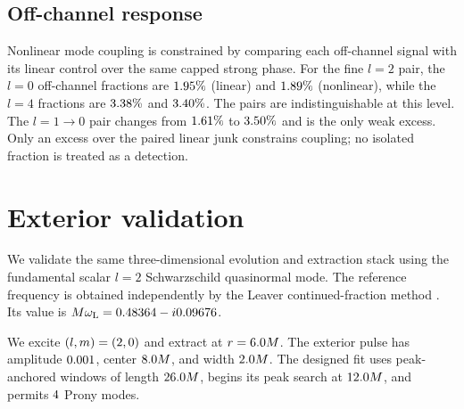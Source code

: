 \documentclass[
  aps,
  prd,
  reprint,
  superscriptaddress,
  nofootinbib,
  longbibliography
]{revtex4-2}
\begin{document}
\subsection{Off-channel response}

Nonlinear mode coupling is constrained by comparing each off-channel signal
with its linear control over the same capped strong phase.
For the fine $l=2$ pair, the $l=0$ off-channel fractions are
$1.95\%$ (linear) and $1.89\%$ (nonlinear),
while the $l=4$ fractions are $3.38\%$ and
$3.40\%$.  The pairs are indistinguishable at this level.
The $l=1\to0$ pair changes from $1.61\%$ to
$3.50\%$ and is the only weak excess.  Only an excess over
the paired linear junk constrains coupling; no isolated fraction is treated
as a detection.

\section{Exterior validation}
\label{sec:exterior}

We validate the same three-dimensional evolution and extraction stack using
the fundamental scalar $l=2$ Schwarzschild quasinormal mode.  The reference
frequency is obtained independently by the Leaver continued-fraction method
\cite{Leaver1985}.
Its value is
$M\omega_{\rm L}=0.48364-i0.09676$.

We excite $(l,m)=(2,0)$ and extract at
$r=6.0 M$.
The exterior pulse has amplitude $0.001$, center
$8.0 M$, and width $2.0 M$.
The designed fit uses peak-anchored windows of length
$26.0 M$, begins its peak search at
$12.0 M$, and permits $4$ Prony modes.
\end{document}
